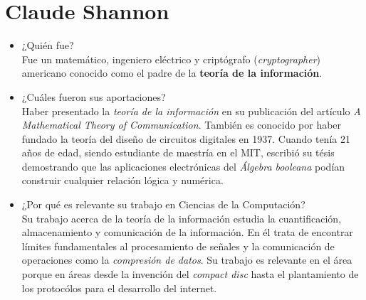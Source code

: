 \documentclass[11pt,letterpaper]{article}
\begin{document}
\section{Claude Shannon}
    \begin{itemize}
        \item ¿Quién fue? \\
            Fue un matemático, ingeniero eléctrico y criptógrafo (\textit{cryptographer})
            americano conocido como el padre de la \textbf{teoría de la información}.
        \item ¿Cuáles fueron sus aportaciones? \\
            Haber presentado la \textit{teoría de la información} en su publicación
            del artículo \textit{A Mathematical Theory of Communication}. También es
            conocido por haber fundado la teoría del diseño de circuitos digitales en 1937.
            Cuando tenía 21 años de edad, siendo estudiante de maestría en el MIT,
            escribió su tésis demostrando que las aplicaciones electrónicas
            del \textit{Álgebra booleana} podían construir cualquier relación lógica y numérica.
        \item ¿Por qué es relevante su trabajo en Ciencias de la Computación? \\
            Su trabajo acerca de la teoría de la información estudia la cuantificación,
            almacenamiento y comunicación de la información. En él trata de encontrar
            límites fundamentales al procesamiento de señales y la comunicación de
            operaciones como la \textit{compresión de datos}. Su trabajo es relevante
            en el área porque en áreas desde la invención del \textit{compact disc}
            hasta el plantamiento de los protocólos para el desarrollo del internet.
    \end{itemize}
\end{document}
